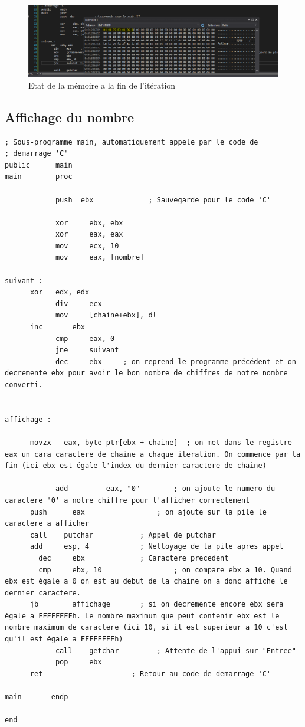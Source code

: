 \documentclass[11pt]{report}
\begin{document}
\begin{figure}[ht]
\includegraphics[width=12cm]{capture10.PNG}
\caption{Etat de la mémoire a la fin de l'itération}
\end{figure}

\newpage
\subsection{Affichage du nombre}

\begin{lstlisting}
; Sous-programme main, automatiquement appele par le code de
; demarrage 'C'
public      main
main        proc

			push  ebx             ; Sauvegarde pour le code 'C'

			xor		ebx, ebx
			xor		eax, eax
			mov		ecx, 10
			mov		eax, [nombre]

suivant :
      xor 	edx, edx
			div	    ecx
			mov		[chaine+ebx], dl
      inc		ebx
			cmp		eax, 0
			jne		suivant
			dec		ebx     ; on reprend le programme précédent et on decremente ebx pour avoir le bon nombre de chiffres de notre nombre converti.


affichage :

      movzx   eax, byte ptr[ebx + chaine]  ; on met dans le registre eax un cara caractere de chaine a chaque iteration. On commence par la fin (ici ebx est égale l'index du dernier caractere de chaine)

			add			eax, "0"        ; on ajoute le numero du caractere '0' a notre chiffre pour l'afficher correctement
      push   	eax         		; on ajoute sur la pile le caractere a afficher
      call    putchar     		; Appel de putchar
      add     esp, 4      		; Nettoyage de la pile apres appel
  		dec     ebx             ; Caractere precedent
	    cmp     ebx, 10 				; on compare ebx a 10. Quand ebx est égale a 0 on est au debut de la chaine on a donc affiche le dernier caractere.
      jb     	affichage       ; si on decremente encore ebx sera égale a FFFFFFFFh. Le nombre maximum que peut contenir ebx est le nombre maximum de caractere (ici 10, si il est superieur a 10 c'est qu'il est égale a FFFFFFFFh)
			call    getchar         ; Attente de l'appui sur "Entree"
			pop     ebx
      ret                     ; Retour au code de demarrage 'C'

main       endp

end




\end{lstlisting}
\end{document}

